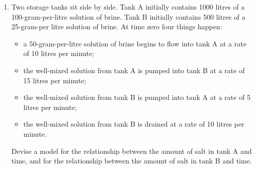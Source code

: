 \documentclass[11pt]{article}
\begin{document}
\begin{enumerate}
\begin{enumerate}
\begin{enumerate}
          \item $A={-1 \quad 2 \brack -1\ -1}$, $\vec{b}={-1\brack 1}$, with $\vec{u}(0) = {1\brack 1}$.
          \item $A={2 \ 3\brack 4\ 6}$, $\vec{b} = {-6\brack -12}$ with $\vec{u}(0) = {1\brack -3}$.
          \item $A={2 \ 3\brack 4\ 6}$, $\vec{b} = {\, 7\,\brack 1}$ with $\vec{u}(0) = {1\brack -3}$.
        \end{enumerate}
      \item Two storage tanks sit side by side. Tank A initially contains 1000 litres of a 100-gram-per-litre solution of brine. Tank B initially contains 500 litres of a 25-gram-per litre solution of brine. At time zero four things happen:
        \begin{itemize}
          \item a 50-gram-per-litre solution of brine begins to flow into tank A at a rate of 10 litres per minute;
          \item the well-mixed solution from tank A is pumped into tank B at a rate of 15 litres per minute;
          \item the well-mixed solution from tank B is pumped into tank A at a rate of 5 litres per minute;
          \item the well-mixed solution from tank B is drained at a rate of 10 litres per minute.
        \end{itemize}	 
        Devise a model for the relationship between the amount of salt in tank A and time, and for the relationship between the amount of salt in tank B and time.
    \end{enumerate}
\end{enumerate}
\end{document}
